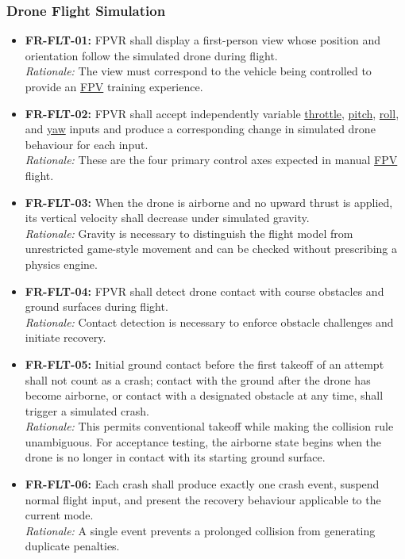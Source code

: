 \documentclass[12pt]{article}
\begin{document}
\subsubsection{Drone Flight Simulation}
\label{sec:s2-flight}
\begin{itemize}
\item \hypertarget{req:FR-FLT-01}{}\textbf{FR-FLT-01:} FPVR shall display a first-person view whose position and orientation follow the simulated drone during flight.\\
\textit{Rationale:} The view must correspond to the vehicle being controlled to provide an \hyperlink{glos:FPV}{FPV} training experience.
\item \hypertarget{req:FR-FLT-02}{}\textbf{FR-FLT-02:} FPVR shall accept independently variable \hyperlink{glos:Throttle}{throttle}, \hyperlink{glos:Throttle}{pitch}, \hyperlink{glos:Throttle}{roll}, and \hyperlink{glos:Throttle}{yaw} inputs and produce a corresponding change in simulated drone behaviour for each input.\\
\textit{Rationale:} These are the four primary control axes expected in manual \hyperlink{glos:FPV}{FPV} flight.
\item \hypertarget{req:FR-FLT-03}{}\textbf{FR-FLT-03:} When the drone is airborne and no upward thrust is applied, its vertical velocity shall decrease under simulated gravity.\\
\textit{Rationale:} Gravity is necessary to distinguish the flight model from unrestricted game-style movement and can be checked without prescribing a physics engine.
\item \hypertarget{req:FR-FLT-04}{}\textbf{FR-FLT-04:} FPVR shall detect drone contact with course obstacles and ground surfaces during flight.\\
\textit{Rationale:} Contact detection is necessary to enforce obstacle challenges and initiate recovery.
\item \hypertarget{req:FR-FLT-05}{}\textbf{FR-FLT-05:} Initial ground contact before the first takeoff of an attempt shall not count as a crash; contact with the ground after the drone has become airborne, or contact with a designated obstacle at any time, shall trigger a simulated crash.\\
\textit{Rationale:} This permits conventional takeoff while making the collision rule unambiguous. For acceptance testing, the airborne state begins when the drone is no longer in contact with its starting ground surface.
\item \hypertarget{req:FR-FLT-06}{}\textbf{FR-FLT-06:} Each crash shall produce exactly one crash event, suspend normal flight input, and present the recovery behaviour applicable to the current mode.\\
\textit{Rationale:} A single event prevents a prolonged collision from generating duplicate penalties.
\end{itemize}
\end{document}
